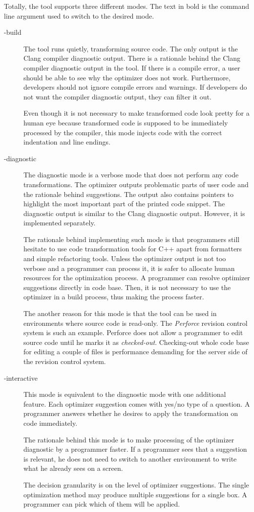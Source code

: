Totally, the tool supports three different modes. The text in bold is the command line argument used to switch to the desired mode.
\begin{description}
\item[-build]{
The tool runs quietly, transforming source code. The only output is the Clang compiler diagnostic output. There is a rationale behind the Clang compiler diagnostic output in the tool. If there is a compile error, a user should be able to see why the optimizer does not work. Furthermore, developers should not ignore compile errors and warnings. If developers do not want the compiler diagnostic output, they can filter it out.

Even though it is not necessary to make transformed code look pretty for a human eye because transformed code is supposed to be immediately processed by the compiler, this mode injects code with the correct indentation and line endings.
}
\item[-diagnostic]{
The diagnostic mode is a verbose mode that does not perform any code transformations. The optimizer outputs problematic parts of user code and the rationale behind suggestions. The output also contains pointers to highlight the most important part of the printed code snippet. The diagnostic output is similar to the Clang diagnostic output. However, it is implemented separately.

The rationale behind implementing such mode is that programmers still hesitate to use code transformation tools for C++ apart from formatters and simple refactoring tools. Unless the optimizer output is not too verbose and a programmer can process it, it is safer to allocate human resources for the optimization process. A programmer can resolve optimizer suggestions directly in code base. Then, it is not necessary to use the optimizer in a build process, thus making the process faster.

The another reason for this mode is that the tool can be used in environments where source code is read-only. The \emph{Perforce} \cite{perforce} revision control system is such an example. Perforce does not allow a programmer to edit source code until he marks it as \emph{checked-out}. Checking-out whole code base for editing a couple of files is performance demanding for the server side of the revision control system.
}
\item[-interactive]{
This mode is equivalent to the diagnostic mode with one additional feature. Each optimizer suggestion comes with yes/no type of a question. A programmer answers whether he desires to apply the transformation on code immediately.

The rationale behind this mode is to make processing of the optimizer diagnostic by a programmer faster. If a programmer sees that a suggestion is relevant, he does not need to switch to another environment to write what he already sees on a screen.

The decision granularity is on the level of optimizer suggestions. The single optimization method may produce multiple suggestions for a single box. A programmer can pick which of them will be applied.
}
\end{description}

